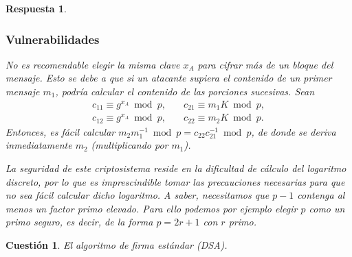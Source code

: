 \documentclass[
  a4paper,
  spanish,
  12pt,
]{scrartcl}
\theoremstyle{ejercicio-style}
\newtheorem{ejer}{Cuestión}
\theoremstyle{remark-style}
\newtheorem*{sol}{Respuesta}
\theoremstyle{teorema-style}
\begin{document}
\begin{sol}
\subsubsection*{Vulnerabilidades}

No es recomendable elegir la misma clave $x_A$ para cifrar más de un bloque del mensaje. Esto se debe a que si un atacante supiera el contenido de un primer mensaje \(m_{1}\), podría calcular el contenido de las porciones sucesivas. Sean
\begin{align*}
c_{11}\equiv g^{x_{A}} \bmod{p}, \quad& c_{21}\equiv m_{1}K\bmod{p}, \\
c_{12}\equiv g^{x_{A}} \bmod{p}, \quad& c_{22}\equiv m_{2}K\bmod{p}.
\end{align*}
Entonces, es fácil calcular \(m_2m_1^{-1} \bmod p = c_{22}c_{21}^{-1} \bmod{p}\), de donde se deriva inmediatamente \(m_{2}\) (multiplicando por \(m_{1}\)).

La seguridad de este criptosistema reside en la dificultad de cálculo del logaritmo discreto, por lo que es imprescindible tomar las precauciones necesarias para que no sea fácil calcular dicho logaritmo. A saber, necesitamos que $p-1$ contenga al menos un factor primo elevado. Para ello podemos por ejemplo elegir $p$ como un \textit{primo seguro}, es decir, de la forma $p = 2r + 1$ con $r$ primo.
\end{sol}

\begin{ejer}
  El algoritmo de firma estándar (DSA).
\end{ejer}
\end{document}
